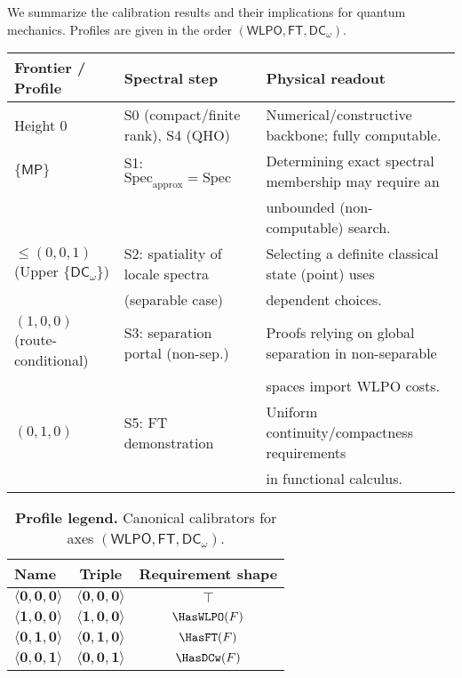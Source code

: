 \documentclass[11pt]{article}
\newcommand{\WLPO}{\mathsf{WLPO}}
\newcommand{\FT}{\mathsf{FT}}
\newcommand{\DCw}{\mathsf{DC}_{\omega}}
\newcommand{\MP}{\mathsf{MP}}
\newcommand{\hzero}{\mathbf{0}}
\newcommand{\hone}{\mathbf{1}}
\newcommand{\allzero}{\langle \hzero,\hzero,\hzero\rangle}
\newcommand{\WLPOonly}{\langle \hone,\hzero,\hzero\rangle}
\newcommand{\FTonly}{\langle \hzero,\hone,\hzero\rangle}
\newcommand{\DCwonly}{\langle \hzero,\hzero,\hone\rangle}
\theoremstyle{plain}
\theoremstyle{definition}
\theoremstyle{remark}
\begin{document}
We summarize the calibration results and their implications for quantum mechanics. Profiles are given in the order $(\WLPO, \FT, \DCw)$.

\begin{center}
\begin{tabular}{|l|l|l|}
\hline
\textbf{Frontier / Profile} & \textbf{Spectral step} & \textbf{Physical readout} \\
\hline
Height $0$ & S0 (compact/finite rank), S4 (QHO) & Numerical/constructive backbone; fully computable. \\
\hline
$\{\MP\}$ & S1: $\mathrm{Spec}_{\mathrm{approx}}=\mathrm{Spec}$ & Determining exact spectral membership may require an \\
& & unbounded (non-computable) search. \\
\hline
$\le (0,0,1)$ (Upper $\{\DCw\}$) & S2: spatiality of locale spectra & Selecting a definite classical state (point) uses \\
& (separable case) & dependent choices. \\
\hline
$(1,0,0)$ (route-conditional) & S3: separation portal (non-sep.) & Proofs relying on global separation in non-separable \\
& & spaces import WLPO costs. \\
\hline
$(0,1,0)$ & S5: FT demonstration & Uniform continuity/compactness requirements \\
& & in functional calculus. \\
\hline
\end{tabular}
\end{center}

\begin{table}[t]
  \centering
  \setlength{\tabcolsep}{8pt}
  \renewcommand{\arraystretch}{1.15}
  \begin{tabular}{l c c}
  \hline
  Name & Triple & Requirement shape \\ \hline
  $\allzero$    & $\langle\hzero,\hzero,\hzero\rangle$ & $\top$ \\
  $\WLPOonly$   & $\langle\hone,\hzero,\hzero\rangle$  & $\HasWLPO(F)$ \\
  $\FTonly$     & $\langle\hzero,\hone,\hzero\rangle$  & $\HasFT(F)$ \\
  $\DCwonly$    & $\langle\hzero,\hzero,\hone\rangle$  & $\HasDCw(F)$ \\
  \hline
  \end{tabular}
  \caption{\textbf{Profile legend.} Canonical calibrators for axes $(\WLPO,\FT,\DCw)$.}
  \label{tab:profile-legend}
\end{table}
\end{document}

